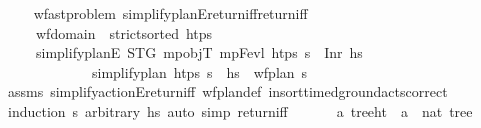 \begin{isabellebody}
\begin{isamarkuptext}
\end{isamarkuptext}\isamarkuptrue%
\ \ \isamarkupfalse%
\ {\isacharparenleft}{\kern0pt}\ wf{\isacharunderscore}{\kern0pt}ast{\isacharunderscore}{\kern0pt}problem{\isacharparenright}{\kern0pt}\ simplify{\isacharunderscore}{\kern0pt}planE{\isacharunderscore}{\kern0pt}return{\isacharunderscore}{\kern0pt}iff{\isacharbrackleft}{\kern0pt}return{\isacharunderscore}{\kern0pt}iff{\isacharbrackright}{\kern0pt}{\isacharcolon}{\kern0pt}\ \isanewline
\ \ \ \ \ {\isachardoublequoteopen}wf{\isacharunderscore}{\kern0pt}domain{\isachardoublequoteclose}\ \ {\isachardoublequoteopen}strict{\isacharunderscore}{\kern0pt}sorted\ htps{\isachardoublequoteclose}\isanewline
\ \ \ \ \ {\isachardoublequoteopen}simplify{\isacharunderscore}{\kern0pt}planE\ STG\ mp{\isacharunderscore}{\kern0pt}objT\ mp{\isacharunderscore}{\kern0pt}Fevl\ htps\ {\isasympi}s\ {\isacharequal}{\kern0pt}\ Inr\ hs\ \isanewline
\ \ \ \ \ \ \ \ \ \ \ \ {\isasymlongleftrightarrow}\ {\isacharparenleft}{\kern0pt}simplify{\isacharunderscore}{\kern0pt}plan\ htps\ {\isasympi}s\ {\isacharequal}{\kern0pt}\ hs\ {\isasymand}\ wf{\isacharunderscore}{\kern0pt}plan\ {\isasympi}s{\isacharparenright}{\kern0pt}{\isachardoublequoteclose}\isanewline
%
\isadelimproof
\ \ \ \ %
\endisadelimproof
%
\isatagproof
{}\isamarkupfalse%
\ assms\ simplify{\isacharunderscore}{\kern0pt}actionE{\isacharunderscore}{\kern0pt}return{\isacharunderscore}{\kern0pt}iff\ wf{\isacharunderscore}{\kern0pt}plan{\isacharunderscore}{\kern0pt}def\ insort{\isacharunderscore}{\kern0pt}timed{\isacharunderscore}{\kern0pt}ground{\isacharunderscore}{\kern0pt}acts{\isacharunderscore}{\kern0pt}correct\isanewline
\ \ \ \ \isamarkupfalse%
\ {\isacharparenleft}{\kern0pt}induction\ {\isasympi}s\ arbitrary{\isacharcolon}{\kern0pt}\ hs{\isacharparenright}{\kern0pt}\ {\isacharparenleft}{\kern0pt}auto\ simp{\isacharcolon}{\kern0pt}\ return{\isacharunderscore}{\kern0pt}iff{\isacharparenright}{\kern0pt}%
\endisatagproof
{\isafoldproof}%
%
\isadelimproof
\isanewline
%
\endisadelimproof
\isanewline
\ \ \isanewline
\ \ \isamarkupfalse%
\ {\isacharprime}{\kern0pt}a\ tree{\isacharunderscore}{\kern0pt}ht\ {\isacharequal}{\kern0pt}\ {\isachardoublequoteopen}{\isacharparenleft}{\kern0pt}{\isacharprime}{\kern0pt}a\ {\isasymtimes}\ nat{\isacharparenright}{\kern0pt}\ tree{\isachardoublequoteclose}\isanewline
\isanewline
\ \ \isamarkupfalse%

\end{isabellebody}
